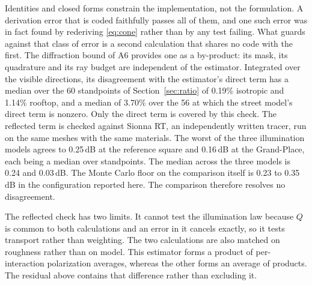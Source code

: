 Identities and closed forms constrain the implementation, not the formulation.
A derivation error that is coded faithfully passes all of them, and one such
error was in fact found by rederiving \eqref{eq:cone} rather than by any test
failing. What guards against that class of error is a second calculation that
shares no code with the first. The diffraction bound of A6 provides one as a
by-product: its mask, its quadrature and its ray budget are independent of the
estimator. Integrated over the visible directions, its disagreement with
the estimator's direct term has a median over the 60 standpoints of
Section~\ref{sec:ratio} of 0.19\% isotropic and 1.14\% rooftop, and a median of
3.70\% over the 56 at which the street model's direct term is nonzero. Only the
direct term is covered by this check. The reflected
term is checked against Sionna RT, an independently written tracer, run on the
same meshes with the same materials. The worst of the three illumination models
agrees to 0.25\,dB at the reference square and 0.16\,dB at the Grand-Place, each
being a median over standpoints. The median across the three models is 0.24 and
0.03\,dB. The Monte Carlo floor on the comparison itself is 0.23 to 0.35\,dB in
the configuration reported here. The comparison therefore resolves no
disagreement.

The reflected check has two limits. It cannot test the illumination law because
$Q$ is common to both calculations and an error in it cancels exactly, so it
tests transport rather than weighting. The two calculations are also matched on
roughness rather than on model. This estimator forms a product of per-interaction
polarization averages, whereas the other forms an average of products. The
residual above contains that difference rather than excluding it.
